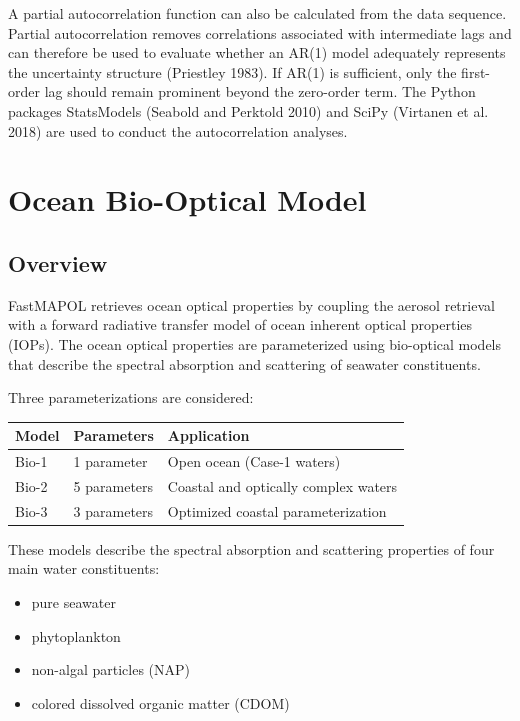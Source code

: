 \documentclass[
  letterpaper,
  open=any]{scrbook}
\providecommand{\tightlist}{%
  \setlength{\itemsep}{0pt}\setlength{\parskip}{0pt}}
\begin{document}
A partial autocorrelation function can also be calculated from the data
sequence. Partial autocorrelation removes correlations associated with
intermediate lags and can therefore be used to evaluate whether an AR(1)
model adequately represents the uncertainty structure (Priestley 1983).
If AR(1) is sufficient, only the first-order lag should remain prominent
beyond the zero-order term. The Python packages StatsModels (Seabold and
Perktold 2010) and SciPy (Virtanen et al. 2018) are used to conduct the
autocorrelation analyses.

\chapter{Ocean Bio-Optical Model}\label{ocean-bio-optical-model}

\section{Overview}\label{overview-3}

FastMAPOL retrieves ocean optical properties by coupling the aerosol
retrieval with a forward radiative transfer model of ocean inherent
optical properties (IOPs). The ocean optical properties are
parameterized using bio-optical models that describe the spectral
absorption and scattering of seawater constituents.

Three parameterizations are considered:

\begin{longtable}[]{@{}lll@{}}
\toprule\noalign{}
Model & Parameters & Application \\
\midrule\noalign{}
\endhead
\bottomrule\noalign{}
\endlastfoot
Bio-1 & 1 parameter & Open ocean (Case-1 waters) \\
Bio-2 & 5 parameters & Coastal and optically complex waters \\
Bio-3 & 3 parameters & Optimized coastal parameterization \\
\end{longtable}

These models describe the spectral absorption and scattering properties
of four main water constituents:

\begin{itemize}
\tightlist
\item
  pure seawater
\item
  phytoplankton
\item
  non-algal particles (NAP)
\item
  colored dissolved organic matter (CDOM)
\end{itemize}
\end{document}
